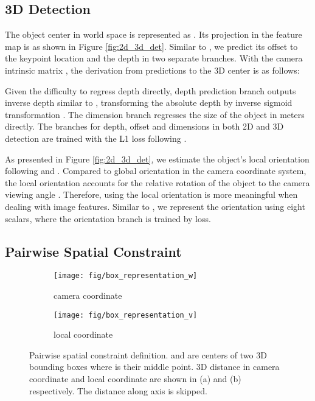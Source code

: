 \documentclass[10pt,twocolumn,letterpaper]{article}
\begin{document}
\subsection{3D Detection}
The object center in world space is represented as . Its projection in the feature map is  as shown in Figure \ref{fig:2d_3d_det}.
Similar to \cite{manhardt_roi_10d_2018, simonelli_disentangling_2019},
we predict its offset  to the keypoint location  and the depth  in two separate branches. With the camera intrinsic matrix , the derivation from predictions to the 3D center  is as follows:

Given the difficulty to regress depth directly, depth prediction branch outputs inverse depth  similar to \cite {eigen2014depth}, transforming the absolute depth by inverse sigmoid transformation .
The dimension branch regresses the size  of the object in meters directly.
The branches for depth, offset and dimensions in both 2D and 3D detection are trained with the L1 loss following \cite{zhou_objects_2019}.

As presented in Figure \ref{fig:2d_3d_det}, we estimate the object's local orientation  following \cite{mousavian_3d_2017} and \cite{zhou_objects_2019}. Compared to global orientation  in the camera coordinate system, the local orientation accounts for the relative rotation of the object to the camera viewing angle . Therefore, using the local orientation is more meaningful when dealing with image features.
Similar to \cite{mousavian_3d_2017, zhou_objects_2019}, we represent the orientation using eight scalars, where the orientation branch is trained by  loss.

\subsection{Pairwise Spatial Constraint}

\begin{figure}[!t]
  \centering
  \begin{subfigure}{0.4\columnwidth}
		\texttt{[image: fig/box\_representation\_w]}
		\caption{camera coordinate}
		\label{fig:cons_key_cam}
	\end{subfigure}
  \begin{subfigure}{0.4\columnwidth}
		\texttt{[image: fig/box\_representation\_v]}
		\caption{local coordinate}
		\label{fig:cons_key_view}
	\end{subfigure}
	\caption{
  Pairwise spatial constraint definition.  and  are centers of two 3D bounding boxes where  is their middle point. 3D distance in camera coordinate  and local coordinate  are shown in (a) and (b) respectively. The distance along  axis is skipped.
  }
	\label{fig:constraint_def}
\end{figure}
\end{document}
